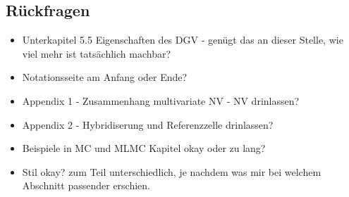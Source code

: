 \subsection{Rückfragen}
\begin{itemize}
	\item Unterkapitel 5.5 Eigenschaften des DGV - genügt das an dieser Stelle, wie viel mehr ist tatsächlich machbar?
	\item Notationsseite am Anfang oder Ende?
	\item Appendix 1 - Zusammenhang multivariate NV - NV drinlassen?
	\item Appendix 2 - Hybridiserung und Referenzzelle drinlassen?
	\item Beispiele in MC und MLMC Kapitel okay oder zu lang?
	\item Stil okay? zum Teil unterschiedlich, je nachdem was mir bei welchem Abschnitt passender erschien.
\end{itemize}